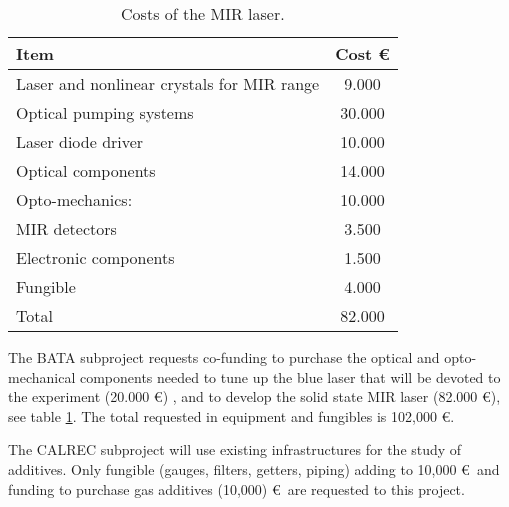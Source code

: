 \begin{table}[h!]
\begin{center}
\begin{tabular}{|l|c|}
\hline
 Item & Cost \euro  \\
 \hline
Laser and nonlinear crystals for MIR range &  9.000 \\
Optical pumping systems & 30.000 \\
Laser diode driver & 10.000  \\
Optical components &14.000 \\
Opto-mechanics: &10.000 \\
MIR detectors & 3.500 \\
Electronic components & 1.500\\
Fungible & 4.000 \\
  \hline
 Total &  82.000 \\
 \hline \hline
\end{tabular}  
\caption{Costs of the MIR laser.}
\label{tab.MIR}
\end{center}
\end{table} 

The BATA subproject requests co-funding to purchase the optical and opto-mechanical components needed to tune up the blue laser that will be devoted to the experiment (20.000 \euro) , and to develop the solid state MIR laser (82.000 \euro), see table \ref{tab.MIR}.  
The total requested in equipment and fungibles is 102,000 \euro.

The CALREC subproject will use existing infrastructures for the study of additives. Only fungible (gauges, filters, getters, piping) adding to 10,000 \euro\ and funding to purchase gas additives (10,000) \euro\ are requested to this project. 
